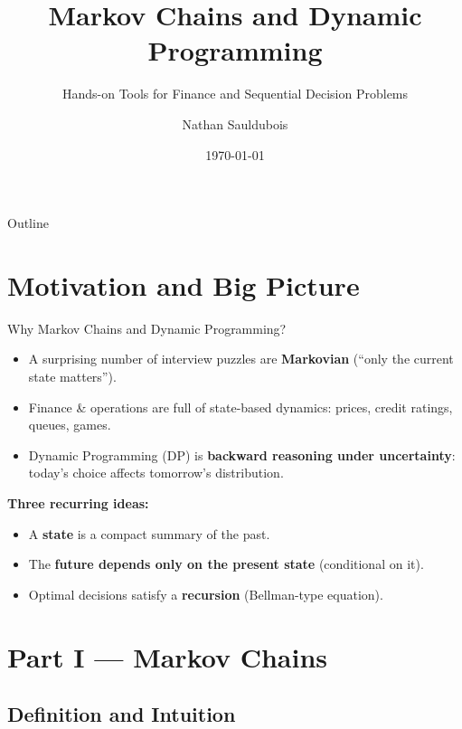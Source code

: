 \documentclass[aspectratio=169]{beamer}
\title{Markov Chains and Dynamic Programming}
\subtitle{Hands-on Tools for Finance and Sequential Decision Problems}
\institute{NYU Tandon School, Finance and Risk Engineering}
\author{Nathan Sauldubois}
\date{\today}
\begin{document}
\begin{frame}
  \titlepage
\end{frame}

\begin{frame}{Outline}
\end{frame}

\section{Motivation and Big Picture}

\begin{frame}{Why Markov Chains and Dynamic Programming?}
\begin{itemize}
  \item A surprising number of interview puzzles are \textbf{Markovian} (``only the current state matters''). \pause
  \item Finance \& operations are full of state-based dynamics: prices, credit ratings, queues, games.\pause
  \item Dynamic Programming (DP) is \textbf{backward reasoning under uncertainty}: today’s choice affects tomorrow’s distribution.\pause
\end{itemize}

\medskip

\textbf{Three recurring ideas:}
\begin{itemize}
  \item A \textbf{state} is a compact summary of the past.\pause
  \item The \textbf{future depends only on the present state} (conditional on it).\pause
  \item Optimal decisions satisfy a \textbf{recursion} (Bellman-type equation).
\end{itemize}
\end{frame}

\section{Part I --- Markov Chains}

\subsection{Definition and Intuition}
\end{document}

